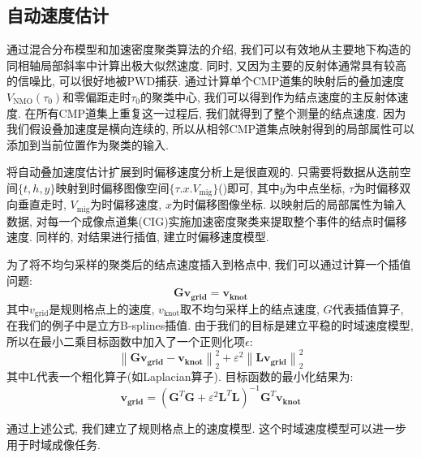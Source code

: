 \subsection{自动速度估计}
通过混合分布模型和加速密度聚类算法的介绍, 我们可以有效地从主要地下构造的同相轴局部斜率中计算出极大似然速度. 同时, 又因为主要的反射体通常具有较高的信噪比, 可以很好地被PWD捕获. 通过计算单个CMP道集的映射后的叠加速度$V_{\mathrm{NMO}}(\tau_0)$和零偏距走时$\tau_0$的聚类中心, 我们可以得到作为结点速度的主反射体速度. 在所有CMP道集上重复这一过程后, 我们就得到了整个测量的结点速度. 因为我们假设叠加速度是横向连续的, 所以从相邻CMP道集点映射得到的局部属性可以添加到当前位置作为聚类的输入. 

将自动叠加速度估计扩展到时偏移速度分析上是很直观的. 只需要将数据从迭前空间$\{t,h,y\}$映射到时偏移图像空间$\{\tau.x.V_{\mathrm{mig}}\}$(\cite{Fomel2007})即可, 其中$y$为中点坐标, $\tau$为时偏移双向垂直走时, $V_{\mathrm{mig}}$为时偏移速度, $x$为时偏移图像坐标. 以映射后的局部属性为输入数据, 对每一个成像点道集(CIG)实施加速密度聚类来提取整个事件的结点时偏移速度. 同样的, 对结果进行插值, 建立时偏移速度模型. 

为了将不均匀采样的聚类后的结点速度插入到格点中, 我们可以通过计算一个插值问题: 
\begin{equation}
    \mathbf{G} \mathbf{v}_{\mathbf {grid }}=\mathbf{v}_{\mathbf{k n o t}}
\end{equation}
其中$v_{\mathrm{grid}}$是规则格点上的速度, $v_{\mathrm{knot}}$取不均匀采样上的结点速度, $G$代表插值算子, 在我们的例子中是立方B-splines插值. 由于我们的目标是建立平稳的时域速度模型, 所以在最小二乘目标函数中加入了一个正则化项$\epsilon$: 
\begin{equation}
\left\|\mathbf{G} \mathbf{v}_{\mathbf {grid }}-\mathbf{v}_{\mathbf{k n o t}}\right\|_{2}^{2}+\varepsilon^{2}\left\|\mathbf{L} \mathbf{v}_{\mathbf{g r i d}}\right\|_{2}^{2}
\end{equation}
其中L代表一个粗化算子(如Laplacian算子). 目标函数的最小化结果为: 
\begin{equation}
    \mathbf{v}_{\mathbf{g r i d}}=\left(\mathbf{G}^{T} \mathbf{G}+\varepsilon^{2} \mathbf{L}^{T} \mathbf{L}\right)^{-1} \mathbf{G}^{T} \mathbf{v}_{\mathbf{k n o t}}
\end{equation}

通过上述公式, 我们建立了规则格点上的速度模型. 这个时域速度模型可以进一步用于时域成像任务. 
